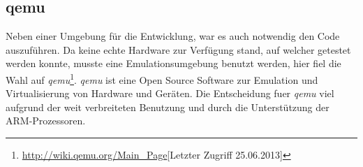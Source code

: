 \subsection{qemu}
Neben einer Umgebung f\"ur die Entwicklung, war es auch notwendig den Code auszuf\"uhren. Da keine echte Hardware zur Verf\"ugung stand, auf welcher \mops getestet werden konnte, musste eine Emulationsumgebung benutzt werden, hier fiel die Wahl auf \textit{qemu}\footnote{\url{http://wiki.qemu.org/Main_Page}[Letzter Zugriff 25.06.2013]}. \textit{qemu} ist eine Open Source Software zur Emulation und Virtualisierung von Hardware und Ger\"aten. Die Entscheidung fuer \textit{qemu} viel aufgrund der weit verbreiteten Benutzung und durch die Unterst\"utzung der ARM-Prozessoren.
 